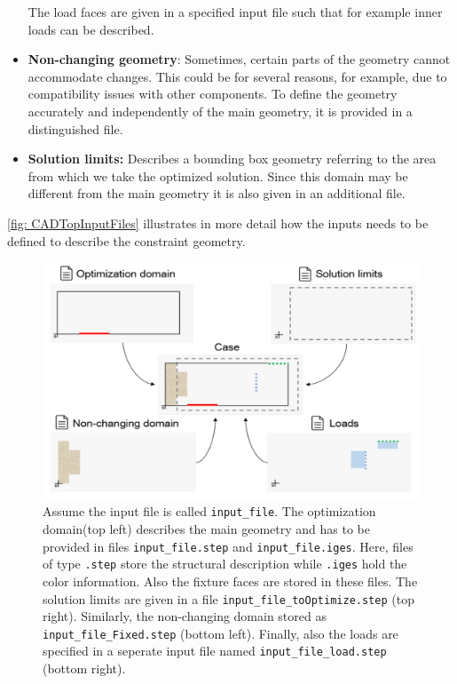 \begin{itemize}
The load faces are given in a specified input file such that for example inner loads can be described.

	\item \textbf{Non-changing geometry}: Sometimes, certain parts of the geometry cannot accommodate changes. This could be for several reasons, for example, due to compatibility issues with other components. To define the geometry accurately and independently of the main geometry, it is provided in a distinguished file.%
	\item \textbf{Solution limits:} Describes a bounding box geometry referring to the area from which we take the optimized solution. Since this domain may be different from the main geometry it is also given in an additional file.
\end{itemize}

\autoref{fig: CADTopInputFiles} illustrates in more detail how the inputs needs to be defined to describe the constraint geometry. 

\begin{figure}
\includegraphics[width=\textwidth]{Pictures/four_files.png}
\caption{Assume the input file is called \texttt{input{\_}file}. The optimization domain(top left) describes the main geometry and has to be provided in files \texttt{input{\_}file.step} and \texttt{input{\_}file.iges}. Here, files of type \texttt{.step} store the structural description while \texttt{.iges} hold the color information. Also the fixture faces are stored in these files. The solution limits are given in a file \texttt{input{\_}file{\_}toOptimize.step} (top right). Similarly, the non-changing domain stored as \texttt{input{\_}file{\_}Fixed.step} (bottom left). Finally, also the loads are specified in a seperate input file named \texttt{input{\_}file{\_}load.step} (bottom right).}
\label{fig: CADTopInputFiles}
\end{figure}
